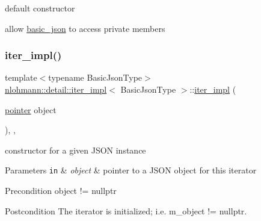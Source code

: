 default constructor 

allow \hyperlink{classnlohmann_1_1basic__json}{basic\+\_\+json} to access private members \mbox{\label{classnlohmann_1_1detail_1_1iter__impl_a88a00484ac201c52fc5f613d88a2918b}} 
\subsubsection{\texorpdfstring{iter\+\_\+impl()}{iter\_impl()}\hspace{0.1cm}{\footnotesize\ttfamily [2/4]}}
{\footnotesize\ttfamily template$<$typename Basic\+Json\+Type$>$ \\
\hyperlink{classnlohmann_1_1detail_1_1iter__impl}{nlohmann\+::detail\+::iter\+\_\+impl}$<$ Basic\+Json\+Type $>$\+::\hyperlink{classnlohmann_1_1detail_1_1iter__impl}{iter\+\_\+impl} (\begin{DoxyParamCaption}\item[{\hyperlink{classnlohmann_1_1detail_1_1iter__impl_a69e52f890ce8c556fd68ce109e24b360}{pointer}}]{object }\end{DoxyParamCaption})\hspace{0.3cm}{\ttfamily [inline]}, {\ttfamily [explicit]}, {\ttfamily [noexcept]}}



constructor for a given J\+S\+ON instance 


\begin{DoxyParams}[1]{Parameters}
\mbox{\tt in}  & {\em object} & pointer to a J\+S\+ON object for this iterator \\
\hline
\end{DoxyParams}
\begin{DoxyPrecond}{Precondition}
object != nullptr 
\end{DoxyPrecond}
\begin{DoxyPostcond}{Postcondition}
The iterator is initialized; i.\+e. {\ttfamily m\+\_\+object != nullptr}. 
\end{DoxyPostcond}
\mbox{\label{classnlohmann_1_1detail_1_1iter__impl_a71f84fb6e009619f12972bcf9002b8cd}} 
